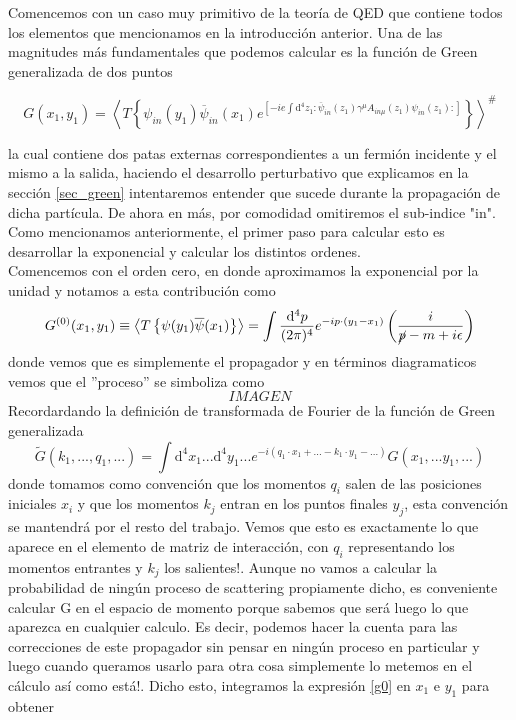 \documentclass{article}
\numberwithin{equation}{section}
\begin{document}
Comencemos con un caso muy primitivo de la teoría de QED que contiene todos los elementos que mencionamos en la introducción anterior. Una de las magnitudes más fundamentales que podemos calcular es la función de Green generalizada de dos puntos 

\begin{equation}\label{qedgreen}
G(x_{1},y_{1})=\left\langle T\left\{ \psi_{in}(y_{1})\overline{\psi}_{in}(x_{1})e^{\left[-ie\int \mathrm{\mathrm{d^4}}z_{1}:\overline{\psi}_{in}(z_{1})\gamma^{\mu}A_{ in \mu}(z_{1})\psi_{in}(z_{1}):\right]}\right\} \right\rangle ^{\#}
\end{equation}

la cual contiene dos patas externas correspondientes a un fermión incidente y el mismo a la salida, haciendo el desarrollo perturbativo que explicamos en la sección \ref{sec_green} intentaremos entender que sucede durante la propagación de dicha partícula. De ahora en más, por comodidad omitiremos el sub-indice "in".
Como mencionamos anteriormente,
el primer paso para calcular esto es desarrollar la exponencial y
calcular los distintos ordenes.\\

Comencemos con el orden cero, en donde
aproximamos la exponencial por la unidad y notamos a esta contribución
como 
\begin{equation}\label{g0}
G^{(0)}(x_{1},y_{1}) \equiv \left\langle T\left\{ \psi(y_{1})\overline{\psi}(x_{1})\right\} \right\rangle =\int\frac{\mathrm{\mathrm{d^4}}p}{(2\pi)^{4}}e^{-ip\cdot(y_{1}-x_{1})}\left(\frac{i}{\cancel{p}-m+i\epsilon}\right)
\end{equation}
donde vemos que es simplemente el propagador y en términos diagramaticos
vemos que el ''proceso'' se simboliza como
\begin{equation}
IMAGEN
\end{equation}
Recordardando la definición de transformada de Fourier de la función
de Green generalizada
\begin{equation}
\widetilde{G}(k_{1},...,q_{1},...)=\int \mathrm{\mathrm{d^4}}x_{1}...\mathrm{\mathrm{d^4}}y_{1}...e^{-i(q_{1}\cdot x_{1} +... - k_{1}\cdot y_{1}-...)}G(x_{1},...y_{1},...) 
\end{equation}
donde tomamos como convención que los momentos $ q_i $ salen de las posiciones iniciales $ x_i $ y que los momentos $ k_j $ entran en los puntos finales $ y_j $, esta convención se mantendrá por el resto del trabajo. 
Vemos que esto es exactamente lo que aparece en el elemento de matriz
de interacción, con $q_{i}$ representando los momentos entrantes
y $k_{j}$ los salientes!. Aunque no vamos a calcular
la probabilidad de ningún proceso de scattering propiamente dicho, es conveniente calcular G en el
espacio de momento porque sabemos que será luego lo que aparezca en
cualquier calculo. Es decir, podemos hacer la cuenta para las correcciones
de este propagador sin pensar en ningún proceso en particular y luego
cuando queramos usarlo para otra cosa simplemente lo metemos en el
cálculo así como está!. Dicho esto, integramos la expresión \ref{g0} en
$x_{1}$ e $y_{1}$ para obtener
\end{document}
